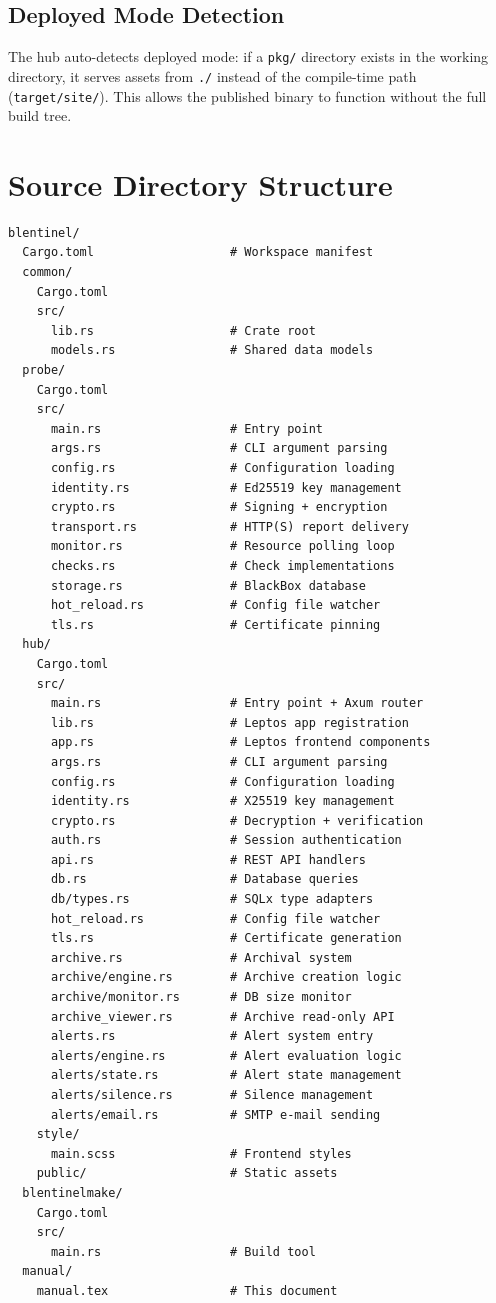 \documentclass[12pt]{report}
\begin{document}
\subsection{Deployed Mode Detection}

The hub auto-detects deployed mode: if a \texttt{pkg/} directory exists in
the working directory, it serves assets from \texttt{./} instead of the
compile-time path (\texttt{target/site/}). This allows the published binary
to function without the full build tree.

\section{Source Directory Structure}

\begin{lstlisting}
blentinel/
  Cargo.toml                   # Workspace manifest
  common/
    Cargo.toml
    src/
      lib.rs                   # Crate root
      models.rs                # Shared data models
  probe/
    Cargo.toml
    src/
      main.rs                  # Entry point
      args.rs                  # CLI argument parsing
      config.rs                # Configuration loading
      identity.rs              # Ed25519 key management
      crypto.rs                # Signing + encryption
      transport.rs             # HTTP(S) report delivery
      monitor.rs               # Resource polling loop
      checks.rs                # Check implementations
      storage.rs               # BlackBox database
      hot_reload.rs            # Config file watcher
      tls.rs                   # Certificate pinning
  hub/
    Cargo.toml
    src/
      main.rs                  # Entry point + Axum router
      lib.rs                   # Leptos app registration
      app.rs                   # Leptos frontend components
      args.rs                  # CLI argument parsing
      config.rs                # Configuration loading
      identity.rs              # X25519 key management
      crypto.rs                # Decryption + verification
      auth.rs                  # Session authentication
      api.rs                   # REST API handlers
      db.rs                    # Database queries
      db/types.rs              # SQLx type adapters
      hot_reload.rs            # Config file watcher
      tls.rs                   # Certificate generation
      archive.rs               # Archival system
      archive/engine.rs        # Archive creation logic
      archive/monitor.rs       # DB size monitor
      archive_viewer.rs        # Archive read-only API
      alerts.rs                # Alert system entry
      alerts/engine.rs         # Alert evaluation logic
      alerts/state.rs          # Alert state management
      alerts/silence.rs        # Silence management
      alerts/email.rs          # SMTP e-mail sending
    style/
      main.scss                # Frontend styles
    public/                    # Static assets
  blentinelmake/
    Cargo.toml
    src/
      main.rs                  # Build tool
  manual/
    manual.tex                 # This document
\end{lstlisting}
\end{document}
